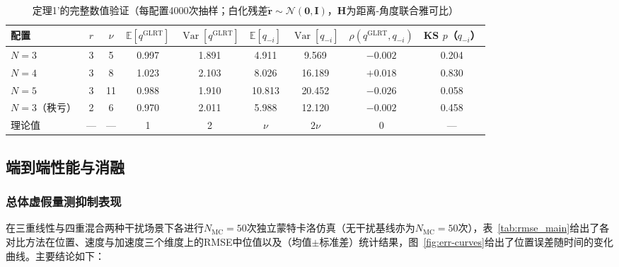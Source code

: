 \documentclass[UTF8,a4paper,zihao=-4]{ctexart}
\begin{document}
\begin{table}[htbp]
\centering
\caption{定理1'的完整数值验证（每配置4000次抽样；白化残差\(\widetilde{\boldsymbol r}\sim\mathcal N(\boldsymbol 0,\boldsymbol I)\)，\(\boldsymbol H\)为距离-角度联合雅可比）}\label{tab:thm1-verify}
\small
\begin{tabular}{@{}lcccccccc@{}}
\toprule
配置 & \(r\) & \(\nu\) & \(\mathbb E[q^{\mathrm{GLRT}}]\) & \(\operatorname{Var}[q^{\mathrm{GLRT}}]\) & \(\mathbb E[q_{-i}]\) & \(\operatorname{Var}[q_{-i}]\) & \(\rho(q^{\mathrm{GLRT}},q_{-i})\) & KS \(p\)（\(q_{-i}\)）\\
\midrule
\(N=3\) & 3 & 5 & 0.997 & 1.891 & 4.911 & 9.569 & \(-0.002\) & 0.204\\
\(N=4\) & 3 & 8 & 1.023 & 2.103 & 8.026 & 16.189 & \(+0.018\) & 0.830\\
\(N=5\) & 3 & 11 & 0.988 & 1.910 & 10.813 & 20.452 & \(-0.026\) & 0.058\\
\(N=3\)（秩亏） & 2 & 6 & 0.970 & 2.011 & 5.988 & 12.120 & \(-0.002\) & 0.458\\
\midrule
理论值 & — & — & 1 & 2 & \(\nu\) & \(2\nu\) & 0 & —\\
\bottomrule
\end{tabular}
\par{}
\end{table}



\subsection{端到端性能与消融}\label{sec:end-to-end}


\subsubsection{总体虚假量测抑制表现}\label{sec:overall}
在三重线性与四重混合两种干扰场景下各进行$N_{\mathrm{MC}}=50$次独立蒙特卡洛仿真（无干扰基线亦为$N_{\mathrm{MC}}=50$次），表~\ref{tab:rmse_main}给出了各对比方法在位置、速度与加速度三个维度上的RMSE中位值以及（均值$\pm$标准差）统计结果，图~\ref{fig:err-curves}给出了位置误差随时间的变化曲线。主要结论如下：
\end{document}
